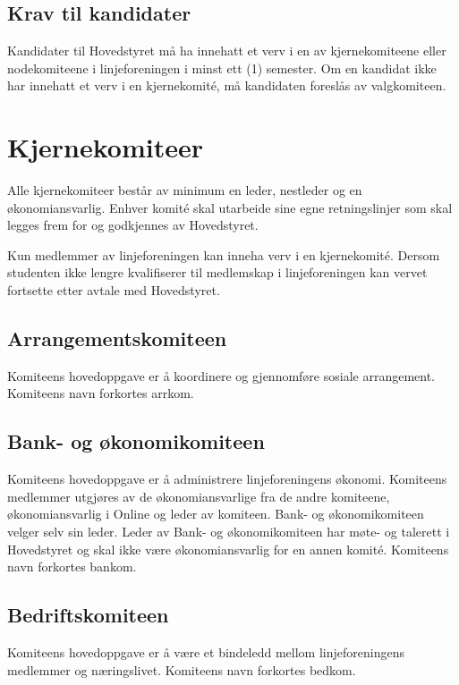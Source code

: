 \subsection{Krav til kandidater}{
Kandidater til Hovedstyret må ha innehatt et verv i en av kjernekomiteene eller nodekomiteene i linjeforeningen i minst ett (1) semester. Om en kandidat ikke har innehatt et verv i en kjernekomité, må kandidaten foreslås av valgkomiteen.
}



\section{Kjernekomiteer}
\label{sec:komiteer}
\vspace{23pt}

Alle kjernekomiteer består av minimum en leder, nestleder og en økonomiansvarlig. Enhver komité skal utarbeide sine egne retningslinjer som skal legges frem for og godkjennes av Hovedstyret. \newline

Kun medlemmer av linjeforeningen kan inneha verv i en kjernekomité. Dersom studenten ikke lengre kvalifiserer til medlemskap i linjeforeningen kan vervet fortsette etter avtale med Hovedstyret.

\vspace{-10pt}
\subsection{Arrangementskomiteen}{
Komiteens hovedoppgave er å koordinere og gjennomføre sosiale arrangement. Komiteens navn forkortes arrkom.

}

\vspace{-10pt}
\subsection{Bank- og økonomikomiteen}{
Komiteens hovedoppgave er å administrere linjeforeningens økonomi. Komiteens medlemmer utgjøres av de økonomiansvarlige fra de andre komiteene, økonomiansvarlig i Online og leder av komiteen. Bank- og økonomikomiteen velger selv sin leder. Leder av Bank- og økonomikomiteen har møte- og talerett i Hovedstyret og skal ikke være økonomiansvarlig for en annen komité. Komiteens navn forkortes bankom.
}

\vspace{-10pt}
\subsection{Bedriftskomiteen}{
Komiteens hovedoppgave er å være et bindeledd mellom linjeforeningens medlemmer og næringslivet. Komiteens navn forkortes bedkom.
}


